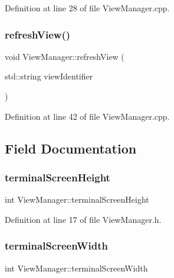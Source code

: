Definition at line 28 of file View\+Manager.\+cpp.

\mbox{\label{class_view_manager_a41c32cebd2cddb4df366d973947ba29b}} 
\subsubsection{\texorpdfstring{refresh\+View()}{refreshView()}}
{\footnotesize\ttfamily void View\+Manager\+::refresh\+View (\begin{DoxyParamCaption}\item[{std\+::string}]{view\+Identifier }\end{DoxyParamCaption})}



Definition at line 42 of file View\+Manager.\+cpp.



\subsection{Field Documentation}
\mbox{\label{class_view_manager_a617dd7697c4745c59b36f5084e4d7201}} 
\subsubsection{\texorpdfstring{terminal\+Screen\+Height}{terminalScreenHeight}}
{\footnotesize\ttfamily int View\+Manager\+::terminal\+Screen\+Height\hspace{0.3cm}{\ttfamily [private]}}



Definition at line 17 of file View\+Manager.\+h.

\mbox{\label{class_view_manager_afd822cc38db72bc8039a65563d5b913f}} 
\subsubsection{\texorpdfstring{terminal\+Screen\+Width}{terminalScreenWidth}}
{\footnotesize\ttfamily int View\+Manager\+::terminal\+Screen\+Width\hspace{0.3cm}{\ttfamily [private]}}



